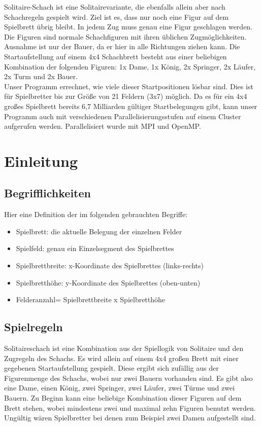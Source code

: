 \documentclass[
	12pt,
	a4paper,
	BCOR10mm,
	DIV14,
	listof=totoc,
	bibliography=totoc,
	headsepline
]{scrreprt}
\begin{document}
Solitaire-Schach ist eine Solitairevariante, die ebenfalls allein aber nach Schachregeln gespielt wird. Ziel ist es, dass nur noch eine Figur auf dem Spielbrett übrig bleibt. In jedem Zug muss genau eine Figur geschlagen werden. Die Figuren sind normale Schachfiguren mit ihren üblichen Zugmöglichkeiten. Ausnahme ist nur der Bauer, da er hier in alle Richtungen ziehen kann. Die Startaufstellung auf einem 4x4 Schachbrett besteht aus einer beliebigen Kombination der folgenden Figuren: 1x Dame, 1x König, 2x Springer, 2x Läufer, 2x Turm und 2x Bauer. \\
Unser Programm errechnet, wie viele dieser Startpositionen lösbar sind. Dies ist für Spielbretter bis zur Größe von 21 Feldern (3x7) möglich. Da es für ein 4x4 großes Spielbrett bereits 6,7 Milliarden gültiger Startbelegungen gibt, kann unser Programm auch mit verschiedenen Parallelisierungsstufen auf einem Cluster aufgerufen werden. Parallelisiert wurde mit MPI und OpenMP.

\tableofcontents

\chapter{Einleitung}
\label{Einleitung}


\section{Begrifflichkeiten}
Hier eine Definition der im folgenden gebrauchten Begriffe:
\begin{itemize}
	\item Spielbrett: die aktuelle Belegung der einzelnen Felder
	\item Spielfeld: genau ein Einzelsegment des Spielbrettes
	\item Spielbrettbreite: x-Koordinate des Spielbrettes (links-rechts)
	\item Spielbretthöhe: y-Koordinate des Spielbrettes (oben-unten)
	\item Felderanzahl= Spielbrettbreite x Spielbretthöhe
\end{itemize}


\section{Spielregeln}
Solitaireschach ist eine Kombination aus der Spiellogik von Solitaire und 
den Zugregeln des Schachs. Es wird allein auf einem 4x4 großen Brett mit einer gegebenen Startaufstellung gespielt. Diese ergibt sich zufällig aus der Figurenmenge des Schachs, wobei nur zwei Bauern vorhanden sind. Es gibt also eine Dame,
einen König, zwei Springer, zwei Läufer, zwei Türme und zwei Bauern. 
Zu Beginn kann eine beliebige Kombination dieser Figuren auf dem Brett stehen, wobei mindestens zwei und maximal zehn Figuren benutzt werden.
Ungültig wären Spielbretter bei denen zum Beispiel zwei Damen aufgestellt sind.
\end{document}
